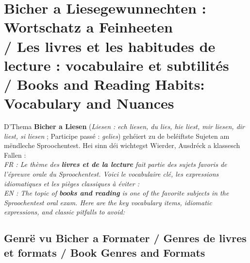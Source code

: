\vspace{1.5em}

\section[Bicher a Liesegewunnechten / Books and Reading Habits]{Bicher a Liesegewunnechten : Wortschatz a Feinheeten \\/ Les livres et les habitudes de lecture : vocabulaire et subtilités \\/ Books and Reading Habits: Vocabulary and Nuances}

D'Thema \textbf{Bicher a Liesen} (\textit{Liesen : ech liesen, du lies, hie liest, mir liesen, dir liest, si liesen} ; Participe passé : \textit{gelies}) gehéiert zu de beléiftste Sujeten am mëndleche Sproochentest. Hei sinn déi wichtegst Wierder, Ausdréck a klassesch Fallen : \\
\textit{FR : Le thème des \textbf{livres et de la lecture} fait partie des sujets favoris de l'épreuve orale du Sproochentest. Voici le vocabulaire clé, les expressions idiomatiques et les pièges classiques à éviter :} \\
\textit{EN : The topic of \textbf{books and reading} is one of the favorite subjects in the Sproochentest oral exam. Here are the key vocabulary items, idiomatic expressions, and classic pitfalls to avoid:}

\subsection{Genrë vu Bicher a Formater / Genres de livres et formats / Book Genres and Formats}

